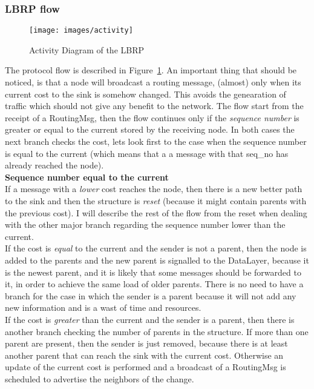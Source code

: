 \documentclass{article}
\begin{document}
	\subsubsection{LBRP flow}
		\begin{figure}[H]
			\begin{center}
				\texttt{[image: images/activity]}
				\caption{Activity Diagram of the LBRP}
				\label{fig:activityLBRP}
			\end{center}
		\end{figure}
The protocol flow is described in Figure~\ref{fig:activityLBRP}. An important thing that should be noticed, is that a node will broadcast a routing message, (almost) only when its current cost to the sink is somehow changed. This avoids the genearation of traffic which should not give any benefit to the network.
The flow start from the receipt of a RoutingMsg, then the flow continues only if the \textit{sequence number} is greater or equal to the current stored by the receiving node. In both cases the next branch checks the cost, lets look first to the case when the sequence number is equal to the current (which means that a a message with that seq\_no has already reached the node). 
\\\textbf{Sequence number equal to the current}
\\If a message with a \emph{lower} cost reaches the node, then there is a new better path to the sink and then the structure is \textit{reset} (because it might contain parents with the previous cost). I will describe the rest of the flow from the reset when dealing with the other major branch regarding the sequence number lower than the current.
\\If the cost is \emph{equal} to the current and the sender is not a parent, then the node is added to the parents and the new parent is signalled to the DataLayer, because it is the newest parent, and it is likely that some messages should be forwarded to it, in order to achieve the same load of older parents. There is no need to have a branch for the case in which the sender is a parent because it will not add any new information and is a wast of time and resources.
\\If the cost is \emph{greater} than the current and the sender is a parent, then there is another branch checking the number of parents in the structure. If more than one parent are present, then the sender is just removed, because there is at least another parent that can reach the sink with the current cost. Otherwise an update of the current cost is performed and a broadcast of a RoutingMsg is scheduled to advertise the neighbors of the change.
\end{document}
